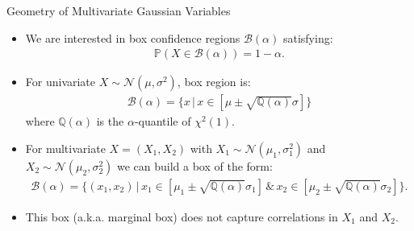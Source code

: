 \documentclass[9pt]{beamer}
\begin{document}
%
\begin{frame}{Geometry of Multivariate Gaussian Variables}

\begin{itemize}
\item We are interested in box confidence regions $\mathcal{B}(\alpha)$ satisfying:
\begin{align*}
\mathbb{P}(X\in \mathcal{B}(\alpha))=1-\alpha.
\end{align*}
\item For univariate $X\sim \mathcal{N}(\mu,\sigma^2)$, box region is:
\begin{align*}
\mathcal{B}(\alpha)=\{x\,|\,x\in [\mu\pm \sqrt{\mathbb{Q}(\alpha)} \sigma]\} 
\end{align*}
where $\mathbb{Q}(\alpha)$ is the $\alpha$-quantile of $\chi^2(1)$. 
\item For multivariate $X=(X_1,X_2)$ with $X_1\sim \mathcal{N}(\mu_1,\sigma_1^2)$ and $X_2\sim \mathcal{N}(\mu_2,\sigma_2^2)$ we can build a box of the form:
\begin{align*}
\mathcal{B}(\alpha)=\{(x_1,x_2)\,|\,x_1\in [\mu_1\pm \sqrt{\mathbb{Q}(\alpha)}\sigma_1]\,\&\,x_2\in [\mu_2\pm \sqrt{\mathbb{Q}(\alpha)}\sigma_2]\}.
\end{align*}
\item This box (a.k.a. marginal box) does not capture correlations in $X_1$ and $X_2$. 
\end{itemize}

\end{frame}
\end{document}
